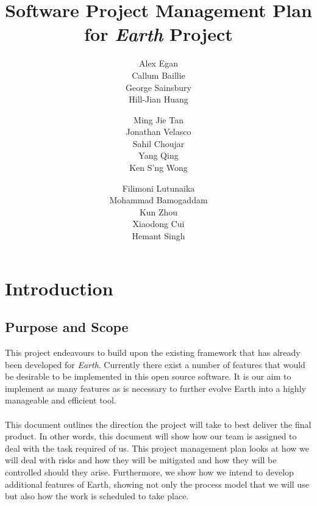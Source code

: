 \documentclass{article}
\begin{document}
\title{\textbf{Software Project Management Plan}\\ for \textit{Earth} Project}\author{Alex Egan \\ Callum Baillie \\ George Sainsbury \\ Hill-Jian Huang \and Ming Jie Tan \\ Jonathan Velasco \\ Sahil Choujar \\ Yang Qing \\ Ken S'ng Wong \and Filimoni Lutunaika \\ Mohammad Bamogaddam \\ Kun Zhou \\ Xiaodong Cui \\ Hemant Singh }

\maketitle
\thispagestyle{empty}
\newpage{}

\thispagestyle{empty}
\tableofcontents
\newpage{}

\setcounter{page}{1}

\section{Introduction}

\label{sec:intro}

\subsection{Purpose and Scope}

This project endeavours to build upon the existing framework that has already been developed for \textit{Earth}. Currently there exist a number of features that would be desirable to be implemented in this open source software. It is our aim to implement as many features as is necessary to further evolve Earth into a highly manageable and efficient tool.\\
\\
This document outlines the direction the project will take to best deliver the final product. In other words, this document will show how our team is assigned to deal with the task required of us. This project management plan looks at how we will deal with risks and how they will be mitigated and how they will be controlled should they arise. Furthermore, we show how we intend to develop additional features of Earth, showing not only the process model that we will use but also how the work is scheduled to take place.
\end{document}
